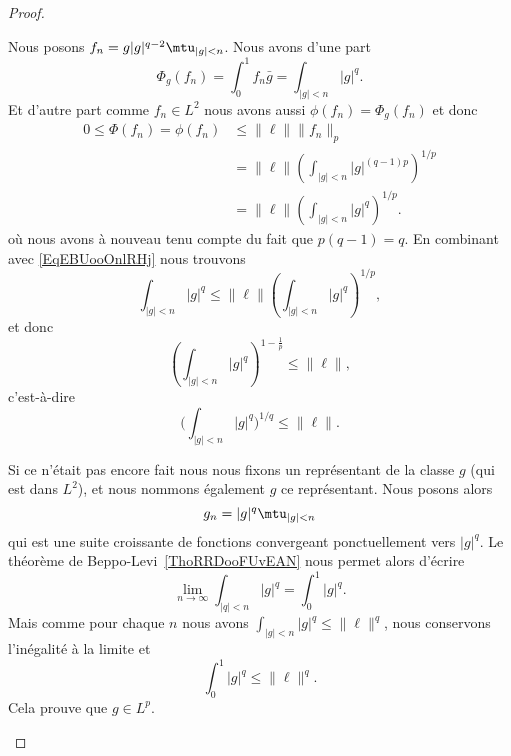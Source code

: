 \begin{proof}
\begin{subproof}
\begin{subproof}
			Nous posons \( f_n=g| g |^{q-2}\mtu_{| g |<n}\). Nous avons d'une part
			\begin{equation}    \label{EqEBUooOnlRHj}
				\Phi_g(f_n)=\int_0^1f_n\bar g=\int_{| g |<n}| g |^q.
			\end{equation}
			Et d'autre part comme \( f_n\in L^2\) nous avons aussi \( \phi(f_n)=\Phi_g(f_n)\) et donc
			\begin{subequations}
				\begin{align}
					0\leq \Phi(f_n)= \phi(f_n) & \leq \| \ell \|\| f_n \|_p                                   \\
					                           & =\| \ell \|\left( \int_{| g |<n}| g |^{(q-1)p} \right)^{1/p} \\
					                           & =\| \ell \|\left( \int_{| g |<n}| g |^q \right)^{1/p}.
				\end{align}
			\end{subequations}
			où nous avons à nouveau tenu compte du fait que \( p(q-1)=q\). En combinant avec \eqref{EqEBUooOnlRHj} nous trouvons
			\begin{equation}
				\int_{| g |<n}| g |^q\leq \| \ell \|\left( \int_{| g |<n}| g |^q \right)^{1/p},
			\end{equation}
			et donc
			\begin{equation}
				\left( \int_{| g |<n}| g |^{q} \right)^{1-\frac{1}{ p }}\leq \| \ell \|,
			\end{equation}
			c'est-à-dire
			\begin{equation}
				\Big( \int_{| g |<n}| g |^q \Big)^{1/q}\leq \| \ell \|.
			\end{equation}

			Si ce n'était pas encore fait nous nous fixons un représentant de la classe \( g\) (qui est dans \( L^2\)), et nous nommons également \( g\) ce représentant. Nous posons alors
			\begin{equation}
				g_n=| g |^q\mtu_{| g |<n}
			\end{equation}
			qui est une suite croissante de fonctions convergeant ponctuellement vers \( | g |^q\). Le théorème de Beppo-Levi~\ref{ThoRRDooFUvEAN} nous permet alors d'écrire
			\begin{equation}
				\lim_{n\to \infty} \int_{| q |<n}| g |^q=\int_{0}^1| g |^q.
			\end{equation}
			Mais comme pour chaque \( n\) nous avons \( \int_{| g |<n}| g |^q\leq \| \ell \|^q\), nous conservons l'inégalité à la limite et
			\begin{equation}
				\int_0^1| g |^q\leq \| \ell \|^q.
			\end{equation}
			Cela prouve que \( g\in L^p\).


\end{subproof}
\end{subproof}
\end{proof}

